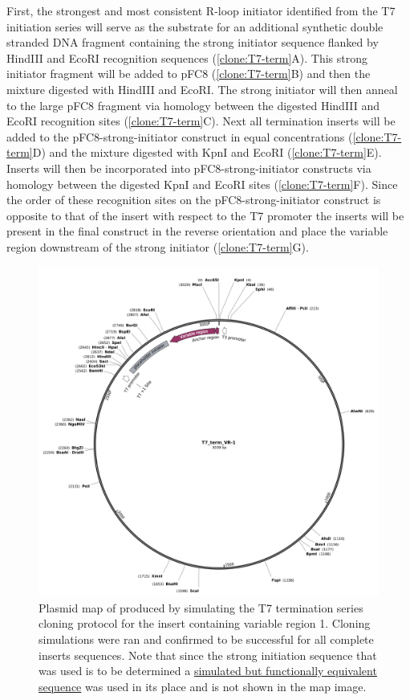 \documentclass[11pt]{article}
\begin{document}
 First, the strongest and most consistent R-loop initiator identified from the T7 initiation series will serve as the substrate for an additional synthetic double stranded DNA fragment containing the strong initiator sequence flanked by  HindIII and EcoRI recognition sequences (\ref{clone:T7-term}A). This strong initiator fragment will be added to pFC8  (\ref{clone:T7-term}B) and then the mixture digested with HindIII and EcoRI. The strong initiator will then anneal to the large pFC8 fragment via homology between the digested HindIII and EcoRI recognition sites (\ref{clone:T7-term}C). Next all termination inserts will be added to the pFC8-strong-initiator construct in equal concentrations (\ref{clone:T7-term}D) and the mixture digested with KpnI and EcoRI (\ref{clone:T7-term}E). Inserts will then be incorporated into pFC8-strong-initiator constructs via homology between the digested KpnI and EcoRI sites (\ref{clone:T7-term}F). Since the order of these recognition sites on the pFC8-strong-initiator construct is opposite to that of the insert with respect to the T7 promoter the inserts will be present in the final construct in the reverse orientation and place the variable region downstream of the strong initiator (\ref{clone:T7-term}G). 
 
 \begin{figure}[H]
 	\includegraphics[width=12cm]{images/plasmid_maps/T7_term_VR-1 Map.png}
 	\centering
 	\caption{Plasmid map of produced by simulating the T7 termination series cloning protocol for the insert containing variable region 1. Cloning simulations were ran and confirmed to be successful for all complete inserts sequences. Note that since the strong initiation sequence that was used is to be determined a \href{https://github.com/EthanHolleman/plasmid-VR-design/blob/main/notes/placeholder_strong_initiator.ipynb}{simulated but functionally equivalent sequence} was used in its place and is not shown in the map image.}
 	\label{clone:T7-term-insert-simulated}
 \end{figure}
 
\end{document}
